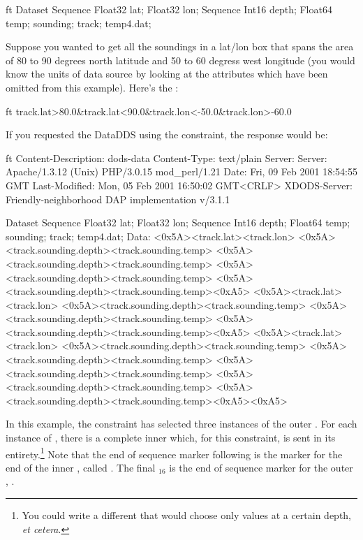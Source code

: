 \documentclass[justify]{nasa-ese}
\begin{document}
\begin{vcode}{ft}
Dataset {
  Sequence {
    Float32 lat;
    Float32 lon;
    Sequence {
      Int16 depth;
      Float64 temp;
    } sounding;
  } track;
} temp4.dat;
\end{vcode}

Suppose you wanted to get all the soundings in a lat/lon box that spans the
area of 80 to 90 degrees north latitude and 50 to 60 degress west longitude
(you would know the units of data source by looking at the attributes which
have been omitted from this example). Here's the \CE:

\begin{vcode}{ft}
track.lat>80.0&track.lat<90.0&track.lon<-50.0&track.lon>-60.0
\end{vcode}

If you requested the DataDDS using the constraint, the response would be:

\begin{vcode}{ft}
Content-Description: dods-data
Content-Type: text/plain
Server: Server: Apache/1.3.12 (Unix)  PHP/3.0.15 mod_perl/1.21
Date: Fri, 09 Feb 2001 18:54:55 GMT
Last-Modified: Mon, 05 Feb 2001 16:50:02 GMT<CRLF>
XDODS-Server: Friendly-neighborhood DAP implementation v/3.1.1

Dataset {
  Sequence {
    Float32 lat;
    Float32 lon;
    Sequence {
      Int16 depth;
      Float64 temp;
    } sounding;
  } track;
} temp4.dat;
Data:
<0x5A><track.lat><track.lon>
<0x5A><track.sounding.depth><track.sounding.temp>
<0x5A><track.sounding.depth><track.sounding.temp>
<0x5A><track.sounding.depth><track.sounding.temp>
<0x5A><track.sounding.depth><track.sounding.temp><0xA5>
<0x5A><track.lat><track.lon>
<0x5A><track.sounding.depth><track.sounding.temp>
<0x5A><track.sounding.depth><track.sounding.temp>
<0x5A><track.sounding.depth><track.sounding.temp><0xA5>
<0x5A><track.lat><track.lon>
<0x5A><track.sounding.depth><track.sounding.temp>
<0x5A><track.sounding.depth><track.sounding.temp>
<0x5A><track.sounding.depth><track.sounding.temp>
<0x5A><track.sounding.depth><track.sounding.temp>
<0x5A><track.sounding.depth><track.sounding.temp><0xA5><0xA5>
\end{vcode}

In this example, the constraint has selected three instances of the outer
\Sequence {}. For each instance of , there is a complete
inner \Sequence {} which, for this constraint, is sent in its
entirety.\footnote{You could write a different \CE that would choose only
values at a certain depth, {\it et cetera}.} Note that the end of sequence
marker following  is the marker for the end of the
inner \Sequence, called . The final $_{16}$ is the end
of sequence marker for the outer \Sequence, .
\end{document}
